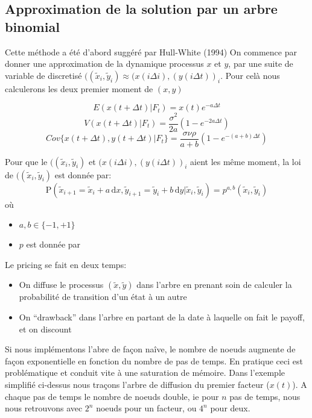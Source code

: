 \documentclass[paper=a4, fontsize=11pt]{scrartcl}
\numberwithin{equation}{section}		%
\numberwithin{figure}{section}			%
\numberwithin{table}{section}				%
\theoremstyle{definition}
\begin{document}
\newpage
\subsection{Approximation de la solution par un arbre binomial}

Cette méthode a été d'abord suggéré par Hull-White (1994)
On commence par donner une approximation de la dynamique processus $x$ et $y$, par une suite de variable de discretisé $((\widetilde{x}_i, \widetilde{y}_i) \approx (x(i \Delta i), (y(i \Delta t))_i $. Pour celà nous calculerons les deux premier moment de $(x, y)$

$$E(x(t+\Delta t) | F_t) = x(t) e^{-a \Delta t}$$
$$V(x(t+\Delta t) | F_t) = \frac{\sigma^2}{2a} (1 - e^{-2a \Delta t})$$
$$Cov\{x(t+\Delta t), y(t+\Delta t) | F_t \} = \frac{\sigma \nu \rho}{a + b} (1-e^{-(a+b)\Delta t})$$

Pour que le $((\widetilde{x}_i, \widetilde{y}_i)$ et $(x(i \Delta i), (y(i \Delta t))_i $ aient les même moment, la loi de  $((\widetilde{x}_i, \widetilde{y}_i)$  est donnée par:
$$\mathrm{P} \left( \widetilde{x}_{i+1} = \widetilde{x}_i + a \, \mathrm{d}x, \widetilde{y}_{i+1} = \widetilde{y}_i + b \, \mathrm{d}y |  \widetilde{x}_i, \widetilde{y}_i \right) = p^{a, b}( \widetilde{x}_i, \widetilde{y}_i)$$
où 
\begin{itemize}
\item $a, b \in \{-1, +1\}$
\item $p$ est donnée par
\end{itemize}

Le pricing se fait en deux temps:
\begin{itemize}
\item On diffuse le processus $(\widetilde{x}, \widetilde{y})$ dans l'arbre en prenant soin de calculer la probabilité de transition d'un état à un autre
\item On ``drawback'' dans l'arbre en partant de la date à laquelle on fait le payoff, et on discount
  \end{itemize}


Si nous implémentons l'abre de façon naîve, le nombre de noeuds augmente de façon exponentielle en fonction du nombre de pas de temps. En pratique ceci est problématique et conduit vite à une saturation de mémoire. Dans l'exemple simplifié ci-dessus nous traçons l'arbre de diffusion du premier facteur ($x(t)$). A chaque pas de temps le nombre de noeuds double, ie pour $n$ pas de temps, nous nous retrouvons avec $2^n$ noeuds pour un facteur, ou $4^n$ pour deux. 
\end{document}
